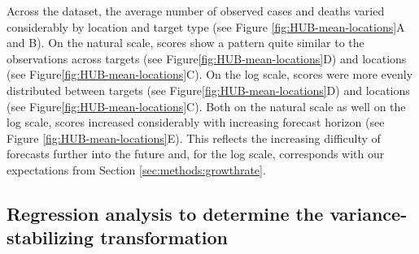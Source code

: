 \documentclass{article}
\begin{document}
Across the dataset, the average number of observed cases and deaths varied considerably by location and target type (see Figure \ref{fig:HUB-mean-locations}A and B). On the natural scale, scores show a pattern quite similar to the observations across targets (see Figure\ref{fig:HUB-mean-locations}D) and locations (see Figure\ref{fig:HUB-mean-locations}C). On the log scale, scores were more evenly distributed between targets (see Figure\ref{fig:HUB-mean-locations}D) and locations (see Figure\ref{fig:HUB-mean-locations}C). Both on the natural scale as well on the log scale, scores increased considerably with increasing forecast horizon (see Figure \ref{fig:HUB-mean-locations}E). This reflects the increasing difficulty of forecasts further into the future and, for the log scale, corresponds with our expectations from Section \ref{sec:methods:growthrate}. 





\subsection{Regression analysis to determine the variance-stabilizing transformation}
\label{sec:HUB-regression}
\end{document}
